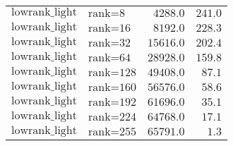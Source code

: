 \begin{table}[h!]
\begin{tabular}{llrr}
$\text{lowrank\_light}$ & $\text{rank=8}$ & $4288.0$ & $241.0$\\
$\text{lowrank\_light}$ & $\text{rank=16}$ & $8192.0$ & $228.3$\\
$\text{lowrank\_light}$ & $\text{rank=32}$ & $15616.0$ & $202.4$\\
$\text{lowrank\_light}$ & $\text{rank=64}$ & $28928.0$ & $159.8$\\
$\text{lowrank\_light}$ & $\text{rank=128}$ & $49408.0$ & $87.1$\\
$\text{lowrank\_light}$ & $\text{rank=160}$ & $56576.0$ & $58.6$\\
$\text{lowrank\_light}$ & $\text{rank=192}$ & $61696.0$ & $35.1$\\
$\text{lowrank\_light}$ & $\text{rank=224}$ & $64768.0$ & $17.1$\\
$\text{lowrank\_light}$ & $\text{rank=255}$ & $65791.0$ & $1.3$\\
\end{tabular}

\end{table}
